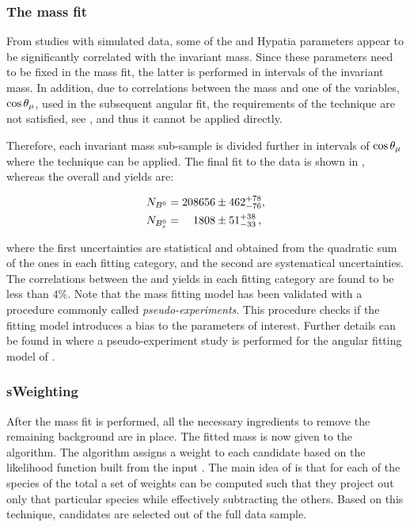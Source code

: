 \subsubsection{The mass fit}
From studies with simulated data, some of the \Bs and \Bd Hypatia parameters appear to be significantly correlated with the \mkpi
invariant mass. Since these parameters need to be fixed in the mass fit, the latter is performed in intervals of the
\mkpi invariant mass. In addition, due to correlations between the mass and one of the variables, $\cos\theta_{\mu}$, used in
the subsequent angular fit, the requirements of the \sPlot technique are not satisfied, see ,
and thus it cannot be applied directly.

Therefore, each \mkpi invariant mass sub-sample is divided further in intervals of $\cos\theta_{\mu}$ where the \sPlot technique
can be applied. The final fit to the data is shown in , whereas the overall \Bs and \Bd yields are:

\begin{align}
  \centering
  N_{\Bd} &= 208656  \pm  462 ^{+ 78}_{-76}, \\
  N_{\Bs} &= \phantom{00}1808  \pm  51 ^{+ 38}_{-33} \, ,
  \label{signal_yields}
\end{align}

\noindent where the first uncertainties are statistical and obtained from the quadratic sum of the ones in each fitting category,
and the second are systematical uncertainties. The correlations between the \Bd and \Bs yields in each fitting category
are found to be less than $4\%$. Note that the mass fitting model has been validated with a procedure commonly called {\it pseudo-experiments}.
This procedure checks if the fitting model introduces a bias to the parameters of interest. Further details can be found in
 where a pseudo-experiment study is performed for the angular fitting model of .

\subsubsection{sWeighting}
After the mass fit is performed, all the necessary ingredients to remove the remaining background are in place.
The fitted mass \pdf is now given to the \sPlot algorithm. The algorithm assigns a weight to each candidate
based on the likelihood function built from the input \pdf. The main idea of \sPlot is that for each of the
species of the total \pdf a set of weights can be computed such that they project out only that particular
species while effectively subtracting the others. Based on this technique, \BsJpsiKst candidates are selected
out of the full data sample.


